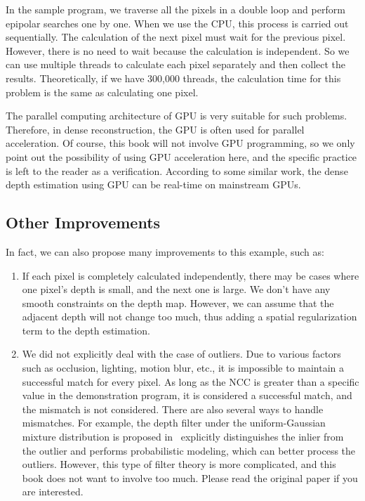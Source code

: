 In the sample program, we traverse all the pixels in a double loop and perform epipolar searches one by one. When we use the CPU, this process is carried out sequentially. The calculation of the next pixel must wait for the previous pixel. However, there is no need to wait because the calculation is independent. So we can use multiple threads to calculate each pixel separately and then collect the results. Theoretically, if we have 300,000 threads, the calculation time for this problem is the same as calculating one pixel.

The parallel computing architecture of GPU is very suitable for such problems. Therefore, in dense reconstruction, the GPU is often used for parallel acceleration. Of course, this book will not involve GPU programming, so we only point out the possibility of using GPU acceleration here, and the specific practice is left to the reader as a verification. According to some similar work, the dense depth estimation using GPU can be real-time on mainstream GPUs.

\subsection{Other Improvements}
In fact, we can also propose many improvements to this example, such as:

\begin{enumerate}
	\item If each pixel is completely calculated independently, there may be cases where one pixel's depth is small, and the next one is large. We don't have any smooth constraints on the depth map. However, we can assume that the adjacent depth will not change too much, thus adding a spatial regularization term to the depth estimation. 
	\item We did not explicitly deal with the case of outliers. Due to various factors such as occlusion, lighting, motion blur, etc., it is impossible to maintain a successful match for every pixel. As long as the NCC is greater than a specific value in the demonstration program, it is considered a successful match, and the mismatch is not considered. There are also several ways to handle mismatches. For example, the depth filter under the uniform-Gaussian mixture distribution is proposed in~\cite{Vogiatzis2011} explicitly distinguishes the inlier from the outlier and performs probabilistic modeling, which can better process the outliers. However, this type of filter theory is more complicated, and this book does not want to involve too much. Please read the original paper if you are interested.
\end{enumerate}


